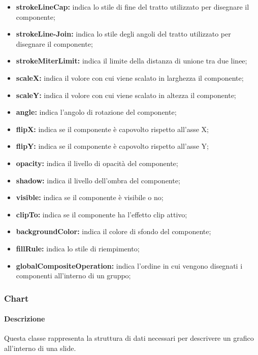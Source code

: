 \begin{itemize}
\begin{itemize}
			\item \textbf{strokeLineCap:} indica lo stile di fine del tratto utilizzato per disegnare il componente;
			\item \textbf{strokeLine-Join:} indica lo stile degli angoli del tratto utilizzato per disegnare il componente;
			\item \textbf{strokeMiterLimit:} indica il limite della distanza di unione tra due linee;
			\item \textbf{scaleX:} indica il volore con cui viene scalato in larghezza il componente;
			\item \textbf{scaleY:} indica il volore con cui viene scalato in altezza il componente;
			\item \textbf{angle:} indica l'angolo di rotazione del componente;
			\item \textbf{flipX:} indica se il componente è capovolto rispetto all'asse X;
			\item \textbf{flipY:} indica se il componente è capovolto rispetto all'asse Y;
			\item \textbf{opacity:} indica il livello di opacità del componente;
			\item \textbf{shadow:} indica il livello dell'ombra del componente;
			\item \textbf{visible:} indica  se il componente è visibile o no;
			\item \textbf{clipTo:} indica se il componente ha l'effetto clip attivo;
			\item \textbf{backgroundColor:} indica il colore di sfondo del componente;
			\item \textbf{fillRule:} indica lo stile di riempimento;
			\item \textbf{globalCompositeOperation:} indica l'ordine in cui vengono disegnati i componenti all'interno di un gruppo;
		\end{itemize}
	\end{itemize}
\newpage

\subsubsection{Chart}


	\paragraph{Descrizione}
	Questa classe rappresenta la struttura di dati necessari per descrivere un grafico all’interno di una slide.
	
